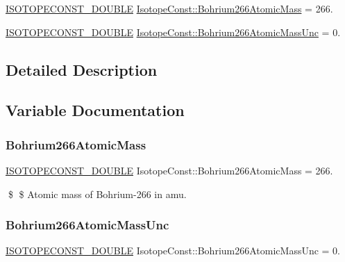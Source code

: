 \begin{DoxyCompactItemize}
\item 
\mbox{\hyperlink{group___isotope_const-_macros_ga8f45a7272ce02c0b4c65c44636ed719a}{I\+S\+O\+T\+O\+P\+E\+C\+O\+N\+S\+T\+\_\+\+D\+O\+U\+B\+LE}} \mbox{\hyperlink{group___isotope_const-_bohrium-_bh266_gacd9755b4e942eab65798edd5570f2efa}{Isotope\+Const\+::\+Bohrium266\+Atomic\+Mass}} = 266.
\item 
\mbox{\hyperlink{group___isotope_const-_macros_ga8f45a7272ce02c0b4c65c44636ed719a}{I\+S\+O\+T\+O\+P\+E\+C\+O\+N\+S\+T\+\_\+\+D\+O\+U\+B\+LE}} \mbox{\hyperlink{group___isotope_const-_bohrium-_bh266_ga500ec923595441d6a511969608e241f7}{Isotope\+Const\+::\+Bohrium266\+Atomic\+Mass\+Unc}} = 0.
\end{DoxyCompactItemize}


\subsection{Detailed Description}


\subsection{Variable Documentation}
\mbox{\label{group___isotope_const-_bohrium-_bh266_gacd9755b4e942eab65798edd5570f2efa}} 
\subsubsection{\texorpdfstring{Bohrium266\+Atomic\+Mass}{Bohrium266AtomicMass}}
{\footnotesize\ttfamily \mbox{\hyperlink{group___isotope_const-_macros_ga8f45a7272ce02c0b4c65c44636ed719a}{I\+S\+O\+T\+O\+P\+E\+C\+O\+N\+S\+T\+\_\+\+D\+O\+U\+B\+LE}} Isotope\+Const\+::\+Bohrium266\+Atomic\+Mass = 266.}

\$ \$ Atomic mass of Bohrium-\/266 in amu. \mbox{\label{group___isotope_const-_bohrium-_bh266_ga500ec923595441d6a511969608e241f7}} 
\subsubsection{\texorpdfstring{Bohrium266\+Atomic\+Mass\+Unc}{Bohrium266AtomicMassUnc}}
{\footnotesize\ttfamily \mbox{\hyperlink{group___isotope_const-_macros_ga8f45a7272ce02c0b4c65c44636ed719a}{I\+S\+O\+T\+O\+P\+E\+C\+O\+N\+S\+T\+\_\+\+D\+O\+U\+B\+LE}} Isotope\+Const\+::\+Bohrium266\+Atomic\+Mass\+Unc = 0.}

